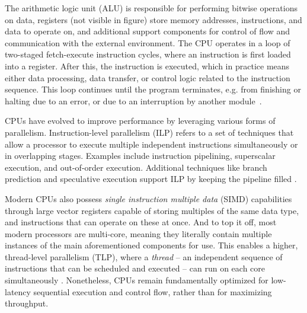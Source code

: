 \documentclass[english,12pt,a4paper,pdftex,sci,utf8]{aaltothesis}
\begin{document}
 The arithmetic logic unit (ALU) is responsible for performing bitwise operations on data, registers (not visible in figure) store memory addresses, instructions, and data to operate on, and additional support components for control of flow and communication with the external environment. The CPU operates in a loop of two-staged fetch-execute instruction cycles, where an instruction is first loaded into a register. After this, the instruction is executed, which in practice means either data processing, data transfer, or control logic related to the instruction sequence. This loop continues until the program terminates, e.g. from finishing or halting due to an error, or due to an interruption by another module~\cite{stallings2011operating}.

CPUs have evolved to improve performance by leveraging various forms of parallelism. Instruction-level parallelism (ILP) refers to a set of techniques that allow a processor to execute multiple independent instructions simultaneously or in overlapping stages. Examples include instruction pipelining, superscalar execution, and out-of-order execution. Additional techniques like branch prediction and speculative execution support ILP by keeping the pipeline filled \cite{hennessy2011computer, suomela_ppc}.

Modern CPUs also possess \emph{single instruction multiple data} (SIMD) capabilities through large vector registers capable of storing multiples of the same data type, and instructions that can operate on these at once. And to top it off, most modern processors are multi-core, meaning they literally contain multiple instances of the main aforementioned components for use. This enables a higher, thread-level parallelism (TLP), where a \emph{thread} -- an independent sequence of instructions that can be scheduled and executed \cite{stallings2011operating} -- can run on each core simultaneously \cite{hennessy2011computer, suomela_ppc}. Nonetheless, CPUs remain fundamentally optimized for low-latency sequential execution and control flow, rather than for maximizing throughput.
\end{document}
